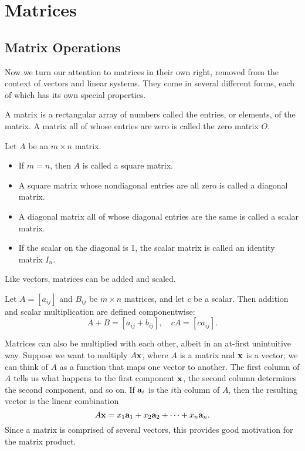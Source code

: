 \documentclass[../m073main.tex]{subfiles}
\begin{document}
\chapter{Matrices}
\section{Matrix Operations}
Now we turn our attention to matrices in their own right, removed from the context of vectors and linear systems.
They come in several different forms, each of which has its own special properties.

\begin{definition}[Matrix]
	A matrix is a rectangular array of numbers called the entries, or elements, of the matrix.
	A matrix all of whose entries are zero is called the zero matrix $O$.
\end{definition}

\begin{definition}
	Let $A$ be an $m \times n$ matrix.
	\begin{itemize}
		\item If $ m =n$, then $A$ is called a square matrix.
		\item A square matrix whose nondiagonal entries are all zero is called a diagonal matrix.
		\item A diagonal matrix all of whose diagonal entries are the same is called a scalar matrix.
		\item If the scalar on the diagonal is 1, the scalar matrix is called an identity matrix $I_n$.
	\end{itemize}
\end{definition}

Like vectors, matrices can be added and scaled.

\begin{definition}
	Let $A = [a_{ij}]$ and $B_{ij}$ be $m \times n$ matrices, and let $c$ be a scalar.
	Then addition and scalar multiplication are defined componentwise:
	\[ A + B = [a_{ij} + b_{ij}], \quad cA = [ca_{ij}]. \]
\end{definition}

Matrices can also be multiplied with each other, albeit in an at-first unintuitive way.
Suppose we want to multiply $A \mathbf{x}$, where $A$ is a matrix and $\mathbf{x}$ is a vector; we can think of $A$ as a function that maps one vector to another.
The first column of $A$ tells us what happens to the first component $\mathbf{x}$, the second column determines the second component, and so on.
If $\mathbf{a}_i$ is the $i$th column of $A$, then the resulting vector is the linear combination
\[ A \mathbf{x} = x_1 \mathbf{a}_1 + x_2 \mathbf{a}_2 + \cdots + x_n \mathbf{a}_n. \]
Since a matrix is comprised of several vectors, this provides good motivation for the matrix product.
\end{document}

